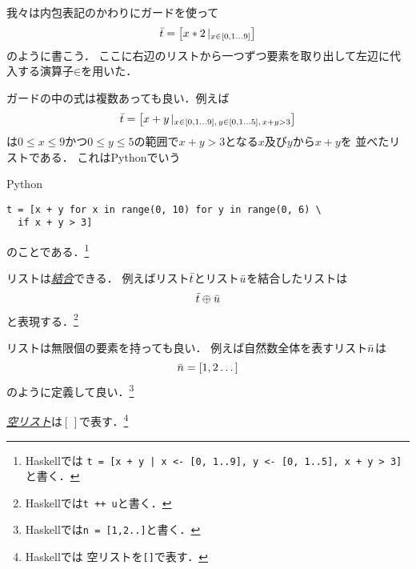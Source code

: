 \documentclass[a5paper,draft]{jsbook}
\newcommand{\programminglanguage}[1]{\textsf{#1}}
\newcommand{\haskell}{\programminglanguage{Haskell}}
\newcommand{\python}{\programminglanguage{Python}}
\newcommand{\keyword}[1]{{\underline{\emph{#1}}}}
\newcommand{\code}[1]{\texttt{#1}}
\newenvironment{pythoncode}{\begin{itembox}[r]{\python}}{\end{itembox}}
\newcommand{\mathListVar}[1]{\Bar{#1}}
\newcommand{\mathGuard}[1]{\mathop{\mid_{#1}}}
\newcommand{\mathEmptyList}{{[\,]}}
\newcommand{\mathAppend}{\oplus}
\newcommand{\mathFrom}{\mathbin{\in}}
\begin{document}
我々は内包表記のかわりにガードを使って
\begin{equation}
\mathListVar{t}=\left[x*2\mathGuard{x\mathFrom{[0,1\dots9]}}\right]
\end{equation}
のように書こう．
ここに右辺のリストから一つずつ要素を取り出して左辺に代入する演算子$\mathFrom$を用いた．

ガードの中の式は複数あっても良い．例えば
\begin{equation}
\mathListVar{t}=\left[x+y\mathGuard{x\mathFrom[0,1\dots9],\,y\mathFrom[0,1\dots5],\,x+y>3}\right]
\end{equation}
は$0\le x\le9$かつ$0\le y\le5$の範囲で$x+y>3$となる$x$及び$y$から$x+y$を
並べたリストである．
これは\python でいう
\begin{pythoncode}
\begin{verbatim}
t = [x + y for x in range(0, 10) for y in range(0, 6) \
  if x + y > 3]
\end{verbatim}
\end{pythoncode}
のことである．\footnote{\haskell では
\code{t = [x + y | x <- [0, 1..9], y <- [0, 1..5], x + y > 3]}と書く．}

リストは\keyword{結合}できる．
例えばリスト$\mathListVar{t}$とリスト$\mathListVar{u}$を結合したリストは
\begin{equation}
\mathListVar{t}\mathAppend\mathListVar{u}
\end{equation}
と表現する．\footnote{\haskell では\code{t ++ u}と書く．}

リストは無限個の要素を持っても良い．
例えば自然数全体を表すリスト$\mathListVar{n}$は
\begin{equation}
\mathListVar{n}=[1,2\dots]
\end{equation}
のように定義して良い．\footnote{\haskell では\code{n = [1,2..]}と書く．}

\keyword{空リスト}は$\mathEmptyList$で表す．\footnote{\haskell では
空リストを\code{[]}で表す．}
\end{document}
